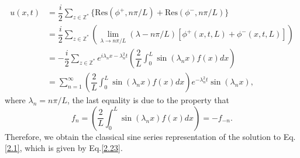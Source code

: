 \documentclass[12pt]{article}
\numberwithin{equation}{section}
\begin{document}
\begin{equation}\label{2.23}
    \begin{split}
        u(x,t)&=\dfrac{i}{2}\sum_{z\in\mathbb{Z}^*}\{\text{Res}(\phi^+,n\pi/L)+\text{Res}(\phi^-,n\pi/L)\}\\
        &=\dfrac{i}{2}\sum_{z\in\mathbb{Z}^*}\left(\lim\limits_{\lambda\to n\pi/L}(\lambda-n\pi/L)[\phi^{+}(x,t,L)+\phi^{-}(x,t,L)]\right)\\
        &=-\dfrac{i}{2}\sum_{z\in\mathbb{Z}^*} e^{i\lambda_n x-\lambda^2_n t}\left(\dfrac{2}{L}\int_{0}^{L}\sin(\lambda_n x)f(x)dx\right)\\
        &=\sum_{n=1}^{\infty} \left(\dfrac{2}{L}\int_{0}^{L}\sin(\lambda_n x)f(x)dx\right)e^{-\lambda^2_n t}\sin(\lambda_n x),
    \end{split}
\end{equation}
where $\lambda_n=n\pi/L$, the last equality is due to the property that 
\begin{equation}
    f_n=\left(\dfrac{2}{L}\int_{0}^{L}\sin(\lambda_n x)f(x)dx\right)=-f_{-n}.
\end{equation}
Therefore, we obtain the classical sine series representation of the solution to Eq.\eqref{2.1}, which is given by Eq.\eqref{2.23}.




\newpage
\end{document}
